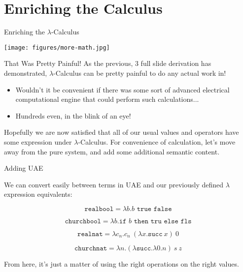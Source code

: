 \documentclass[11pt]{beamer}
\begin{document}
\section[Enrichment]{Enriching the Calculus}
\begin{frame}[fragile=singleslide]{Enriching the $\lambda$-Calculus}
\begin{center}
\texttt{[image: figures/more-math.jpg]}
\end{center}

\end{frame}

\begin{frame}[fragile=singleslide]{That Was Pretty Painful!}
As the previous, 3 full slide derivation has demonstrated, $\lambda$-Calculus can be pretty painful to do any actual work in!  
\begin{itemize}
\item Wouldn't it be convenient if there was some sort of advanced electrical computational engine that could perform such calculations...
\item Hundreds even, in the blink of an eye! 
\end{itemize}
Hopefully we are now satisfied that all of our usual values and operators have some expression under $\lambda$-Calculus.  For convenience of calculation, let's move away from the pure system, and add some additional semantic content. 
\end{frame}

\begin{frame}[fragile=singleslide]{Adding UAE}

We can convert easily between terms in UAE and our previously defined $\lambda$ expression equivalents:

\begin{equation}
\texttt{realbool} = \lambda b. b \texttt{ true false}
\end{equation}

\begin{equation}
\texttt{churchbool} = \lambda b. \texttt{if } b \texttt{ then tru else fls}
\end{equation}

\begin{equation}
\texttt{realnat} = \lambda c_n. c_n\:(\lambda x. \texttt{succ}\:x)\:0
\end{equation} 

\begin{equation}
\texttt{churchnat} = \lambda n. (\lambda \texttt{succ}. \lambda 0. n)\:s\:z
\end{equation} 

From here, it's just a matter of using the right operations on the right values.
\end{frame}
\end{document}
